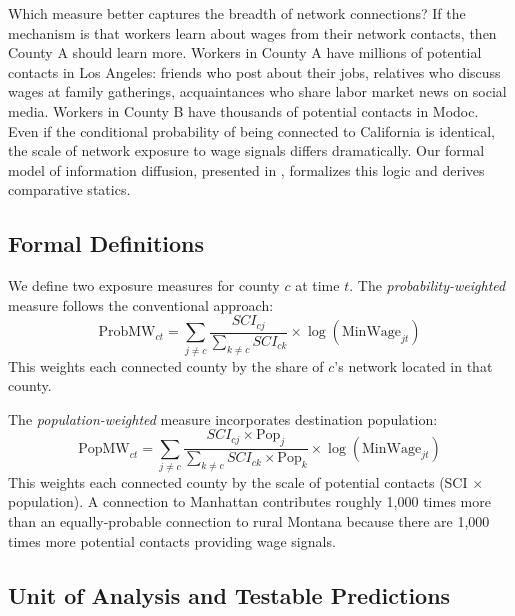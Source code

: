 \documentclass[12pt]{article}
\begin{document}
Which measure better captures the breadth of network connections? If the mechanism is that workers learn about wages from their network contacts, then County A should learn more. Workers in County A have millions of potential contacts in Los Angeles: friends who post about their jobs, relatives who discuss wages at family gatherings, acquaintances who share labor market news on social media. Workers in County B have thousands of potential contacts in Modoc. Even if the conditional probability of being connected to California is identical, the scale of network exposure to wage signals differs dramatically. Our formal model of information diffusion, presented in , formalizes this logic and derives comparative statics.

\subsection{Formal Definitions}

We define two exposure measures for county $c$ at time $t$. The \textit{probability-weighted} measure follows the conventional approach:
\begin{equation}
\text{ProbMW}_{ct} = \sum_{j \neq c} \frac{SCI_{cj}}{\sum_{k \neq c} SCI_{ck}} \times \log(\text{MinWage}_{jt})
\end{equation}
This weights each connected county by the share of $c$'s network located in that county.

The \textit{population-weighted} measure incorporates destination population:
\begin{equation}
\text{PopMW}_{ct} = \sum_{j \neq c} \frac{SCI_{cj} \times \text{Pop}_j}{\sum_{k \neq c} SCI_{ck} \times \text{Pop}_k} \times \log(\text{MinWage}_{jt})
\end{equation}
This weights each connected county by the scale of potential contacts (SCI $\times$ population). A connection to Manhattan contributes roughly 1,000 times more than an equally-probable connection to rural Montana because there are 1,000 times more potential contacts providing wage signals.

\subsection{Unit of Analysis and Testable Predictions}
\end{document}
